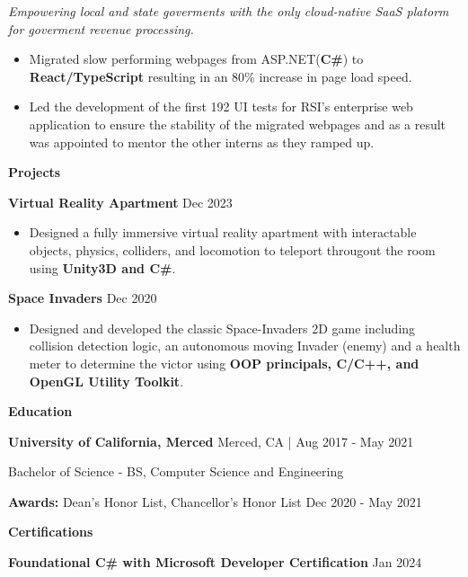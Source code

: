 \documentclass[10pt]{article}
\begin{document}
\textit{Empowering local and state goverments with the only cloud-native SaaS platorm for goverment revenue processing.}

\vspace{1pt}

\begin{itemize}[noitemsep]
    \item Migrated slow performing webpages from ASP.NET(\textbf{C\#}) to \textbf{React/TypeScript} resulting in an 80\% increase in page load speed.
    \item Led the development of the first 192 UI tests for RSI's enterprise web application to ensure the stability of the migrated webpages and as a result was appointed to mentor the other interns as they ramped up.
\end{itemize}



\begin{center}
    \textbf{Projects}
    \hrulefill
\end{center}

\textbf{Virtual Reality Apartment} \hfill Dec 2023
\begin{itemize}
    \item Designed a fully immersive virtual reality apartment with interactable objects, physics, colliders,
    and locomotion to teleport througout the room using \textbf{Unity3D and C\#}.
\end{itemize}

\textbf{Space Invaders} \hfill Dec 2020
\begin{itemize}
    \item Designed and developed the classic Space-Invaders 2D game including collision detection logic, 
    an autonomous moving Invader (enemy) and a health meter to determine the victor using \textbf{OOP principals, C/C++, and OpenGL Utility Toolkit}.
\end{itemize}


\begin{center}
    \textbf{Education}
    \hrulefill
\end{center}
\textbf{University of California, Merced} \hfill Merced, CA | Aug 2017 - May 2021

Bachelor of Science - BS, Computer Science and Engineering 

\textbf{Awards:} Dean's Honor List, Chancellor's Honor List \hfill Dec 2020 - May 2021

\begin{center}
    \textbf{Certifications}
    \hrulefill
\end{center}
\textbf{Foundational C\# with Microsoft Developer Certification} \hfill Jan 2024
\end{document}
